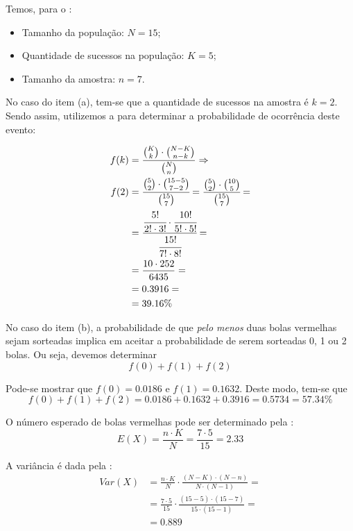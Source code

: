 \begin{sol}
Temos, para o :
\begin{itemize}
    \item Tamanho da população: $N=15$;
    \item Quantidade de sucessos na população: $K=5$;
    \item Tamanho da amostra: $n=7$.
\end{itemize}

No caso do item (a), tem-se que a quantidade de sucessos na amostra é $k=2$.
Sendo assim, utilizemos a  para determinar a
probabilidade de ocorrência deste evento:

\begin{align*}
    f(k) &= \frac{\binom{K}{k} \cdot \binom{N-K}{n-k}}{\binom{N}{n}} \implies \\
    f(2) &= \cfrac{\binom{5}{2} \cdot \binom{15-5}{7-2}}{\binom{15}{7}}
          = \cfrac{\binom{5}{2} \cdot \binom{10}{5}}{\binom{15}{7}} = \\
         &= \cfrac{
                \cfrac{5!}{2! \cdot 3!}
                \cdot
                \cfrac{10!}{5! \cdot 5!}
         }{
                \cfrac{15!}{7! \cdot 8!}
         } = \\
         &= \frac{10 \cdot 252}{6435} = \\
         &= 0.3916 = \\
         &= 39.16 \%
\end{align*}

No caso do item (b), a probabilidade de que \emph{pelo menos} duas bolas
vermelhas sejam sorteadas implica em aceitar a probabilidade de serem sorteadas
0, 1 ou 2 bolas. Ou seja, devemos determinar
\[
f(0)+f(1)+f(2)
\]

Pode-se mostrar que $f(0) = 0.0186$ e $f(1) = 0.1632$. Deste modo, tem-se que
\[
f(0)+f(1)+f(2) = 0.0186 + 0.1632 + 0.3916 = 0.5734 = 57.34\%
\]

O número esperado de bolas vermelhas pode ser determinado pela
:
\[
E(X) = \frac{n \cdot K}{N} = \frac{7 \cdot 5}{15} = 2.33
\]

A variância é dada pela :
\begin{align*}
Var(X) &= \frac{n \cdot K}{N} \cdot \frac{(N-K) \cdot (N-n)}{N \cdot (N-1)} = \\
       &= \frac{7 \cdot 5}{15} \cdot \frac{(15-5) \cdot (15-7)}{15 \cdot (15-1)} = \\
       &= 0.889
\end{align*}
\end{sol}

